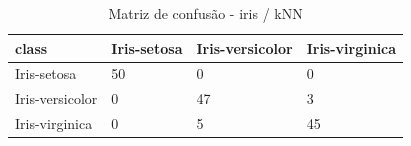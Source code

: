 \begin{table}[htbp]
\centering
\begin{tabular}{llll}
\hline
class & Iris-setosa & Iris-versicolor & Iris-virginica \\
\hline
Iris-setosa & 50 & 0 & 0 \\
Iris-versicolor & 0 & 47 & 3 \\
Iris-virginica & 0 & 5 & 45 \\
\hline
\end{tabular}
\caption{Matriz de confusão - iris / kNN}
\label{tab:ex3-iris-knn-cm}
\end{table}